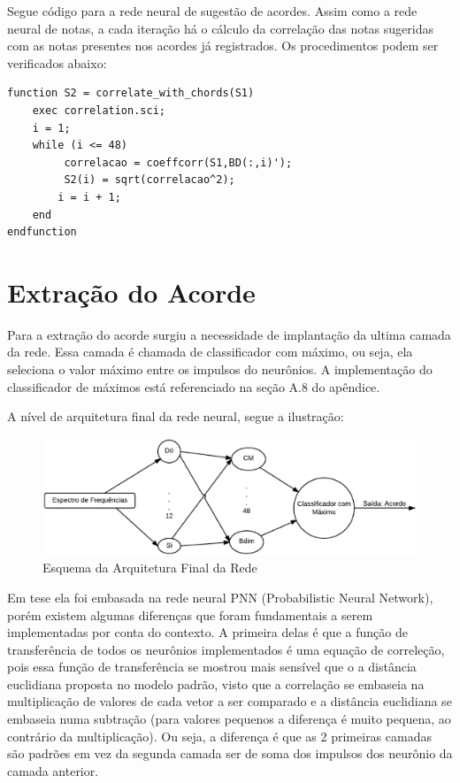 \newpage
Segue código para a rede neural de sugestão de acordes. Assim como a rede neural de notas, a cada iteração há o cálculo da correlação das notas sugeridas com as notas presentes nos acordes já registrados. Os procedimentos podem ser verificados abaixo:

\begin{lstlisting}
function S2 = correlate_with_chords(S1)
	exec correlation.sci;
	i = 1;
	while (i <= 48)
	     correlacao = coeffcorr(S1,BD(:,i)');
	     S2(i) = sqrt(correlacao^2);
	    i = i + 1;
	end
endfunction
\end{lstlisting}

\section{Extração do Acorde}
\label{sec:extracaoacorde}

Para a extração do acorde surgiu a necessidade de implantação da ultima camada da rede. Essa camada é chamada de classificador com máximo, ou seja, ela seleciona o valor máximo entre os impulsos do neurônios. A implementação do classificador de máximos está referenciado na seção A.8 do apêndice.

A nível de arquitetura final da rede neural, segue a ilustração:

\begin{figure}[h]
	\centering
		\includegraphics[keepaspectratio=true,scale=0.45]{figuras/rede_total}
	\caption{Esquema da Arquitetura Final da Rede}
\end{figure}

Em tese ela foi embasada na rede neural PNN (Probabilistic Neural Network), porém existem algumas diferenças que foram fundamentais a serem implementadas por conta do contexto. A primeira delas é que a função de transferência de todos os neurônios implementados é uma equação de correleção, pois essa função de transferência se mostrou mais sensível que o a distância euclidiana proposta no modelo padrão, visto que a correlação se embaseia na multiplicação de valores de cada vetor a ser comparado e a distância euclidiana se embaseia numa subtração (para valores pequenos a diferença é muito pequena, ao contrário da multiplicação). Ou seja, a diferença é que as 2 primeiras camadas são padrões em vez da segunda camada ser de soma dos impulsos dos neurônio da camada anterior.
